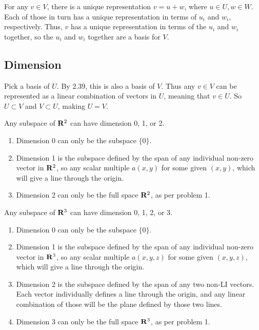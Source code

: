 \documentclass{article}
\begin{document}

For any $v \in V$, there is a unique representation $v = u + w$, where $u \in U,
w \in W$. Each of those in turn has a unique representation in terms of $u_i$
and $w_i$, respectively. Thus, $v$ has a unique representation in terms of the
$u_i$ and $w_i$ together, so the $u_i$ and $w_i$ together are a basis for $V$.

\subsection{Dimension}


Pick a basis of $U$. By 2.39, this is also a basis of $V$. Thus any $v \in V$
can be represented as a linear combination of vectors in $U$, meaning that $v
\in U$. So $U \subset V$ and $V \subset U$, making $U = V$.


Any subspace of $\mathbf{R}^2$ can have dimension 0, 1, or 2.

\begin{enumerate}
\item Dimension 0 can only be the subspace $\{0\}$.
\item Dimension 1 is the subspace defined by the span of any individual non-zero
  vector in $\mathbf{R}^2$, so any scalar multiple $a(x,y)$ for some given $(x,y)$,
  which will give a line through the origin.
\item Dimension 2 can only be the full space $\mathbf{R}^2$, as per problem 1.
\end{enumerate}


Any subspace of $\mathbf{R}^3$ can have dimension 0, 1, 2, or 3.

\begin{enumerate}
\item Dimension 0 can only be the subspace $\{0\}$.
\item Dimension 1 is the subspace defined by the span of any individual non-zero
  vector in $\mathbf{R}^3$, so any scalar multiple $a(x,y,z)$ for some given
  $(x,y,z)$, which will give a line through the origin.
\item Dimension 2 is the subspace defined by the span of any two non-LI vectors.
  Each vector individually defines a line through the origin, and any linear
  combination of those will be the plane defined by those two lines.
\item Dimension 3 can only be the full space $\mathbf{R}^3$, as per problem 1.
\end{enumerate}
\end{document}
